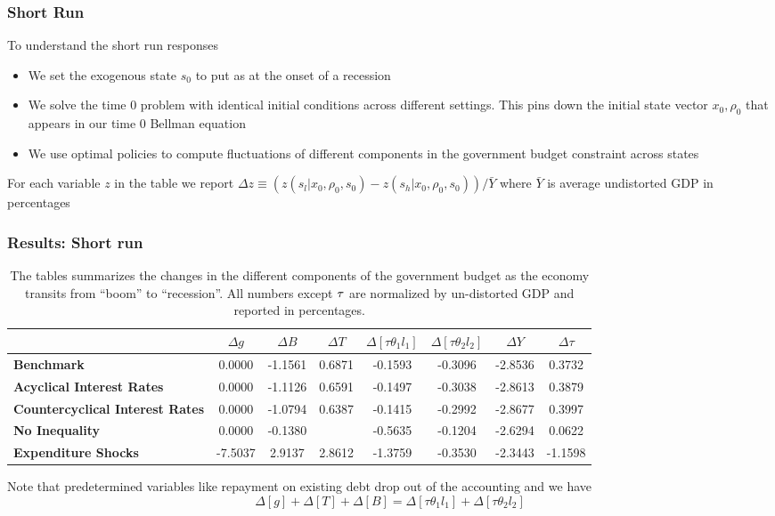 \documentclass{beamer}
\begin{document}
 \begin{frame}
  \frametitle{Short Run}
  To understand the short run responses
  \begin{itemize}
   \item   We set the exogenous state $s_0$ to put as at the onset of a recession
   \item We solve the time 0 problem with identical initial conditions across
different settings. This pins down the initial state vector  $x_0,\rho_0$  that appears in our time $0$ Bellman equation
\item We  use  optimal policies to compute fluctuations of
different components in the government budget constraint across states
  \end{itemize}
For each variable
$z$ in the table we report  $\Delta z\equiv \left( z\left(
s_l|x_0,\rho_0,s_0\right) -z\left( s_h|x_0,\rho_0,s_0\right) \right) /\bar{Y}
$ where $\bar{Y}$ is average undistorted GDP in percentages
 \end{frame}


 \begin{frame}
 \frametitle{Results: Short run}
 {\tiny
\begin{table}[tbp]
\begin{tabular}{|l|c|c|c|c|c|c|c|}
\hline
& \textbf{$\Delta g$} & \textbf{$\Delta B$} & \textbf{$\Delta T$} & \textbf{$%
\Delta [\tau\theta_1l_1]$} & \textbf{$\Delta [\tau\theta_2l_2]$} & \textbf{$%
\Delta Y$} & \textbf{$\Delta \tau$} \\ \hline
\textbf{Benchmark} & 0.0000 & -1.1561 & 0.6871 & -0.1593 & -0.3096 & -2.8536
& 0.3732 \\ \hline
\textbf{Acyclical Interest Rates} & 0.0000 & -1.1126 & 0.6591 & -0.1497 &
-0.3038 & -2.8613 & 0.3879 \\ \hline
\textbf{Countercyclical Interest Rates} & 0.0000 & -1.0794 & 0.6387 & -0.1415 &
-0.2992 & -2.8677 & 0.3997 \\ \hline
\textbf{No Inequality} & 0.0000 & -0.1380 &\color{red}{\textbf{ -0.5459}} & -0.5635 & -0.1204 &
-2.6294 & 0.0622 \\ \hline
\textbf{Expenditure Shocks} & -7.5037 & 2.9137 & 2.8612 & -1.3759 & -0.3530 & -2.3443 &
-1.1598 \\ \hline

\end{tabular}%

\caption{The tables summarizes the changes in the different components of the government budget as the economy transits from ``boom'' to  ``recession''.  All numbers except $\protect\tau $ are normalized by un-distorted GDP  and reported in percentages.
}

\label{tab:ShortRunPolicyResponses}
\end{table}
}
Note that predetermined variables like repayment on existing debt drop out
of the accounting and we have
\begin{equation*}
\Delta [g]+\Delta[T]+ \Delta [B]=\Delta[\tau \theta_1 l_1]+ \Delta[\tau
\theta_2 l_2]
\end{equation*}%

 \end{frame}
\end{document}
